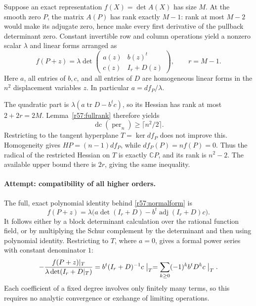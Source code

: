 \documentclass[11pt,a4paper]{article}
\newcommand{\C}{\mathbb{C}}
\numberwithin{equation}{section}
\begin{document}
Suppose an exact representation $f(X)=\det A(X)$ has size $M$. At the smooth zero $P$, the matrix $A(P)$ has rank exactly $M-1$: rank at most $M-2$ would make its adjugate zero, hence make every first derivative of the pullback determinant zero. Constant invertible row and column operations yield a nonzero scalar $\lambda$ and linear forms arranged as
\begin{equation}\label{r57:normalform}
 f(P+z)=\lambda\det\begin{pmatrix}
 a(z)&b(z)^t\\ c(z)&I_r+D(z)
 \end{pmatrix},\qquad r=M-1.
\end{equation}
Here $a$, all entries of $b,c$, and all entries of $D$ are homogeneous linear forms in the $n^2$ displacement variables $z$. In particular $a=df_P/\lambda$.

The quadratic part is $\lambda(a\operatorname{tr}D-b^tc)$, so its Hessian has rank at most $2+2r=2M$. Lemma~\ref{r57:fullrank} therefore yields
\begin{equation}\label{r57:quadraticbound}
 \operatorname{dc}(\operatorname{per}_n)\geq\lceil n^2/2\rceil.
\end{equation}
Restricting to the tangent hyperplane $T=\ker df_P$ does not improve this. Homogeneity gives $HP=(n-1)df_P$, while $df_P(P)=nf(P)=0$. Thus the radical of the restricted Hessian on $T$ is exactly $\C P$, and its rank is $n^2-2$. The available upper bound there is $2r$, giving the same inequality.

\paragraph{Attempt: compatibility of all higher orders.}
The full, exact polynomial identity behind \eqref{r57:normalform} is
\begin{equation}\label{r57:schur}
 f(P+z)=\lambda\bigl(a\det(I_r+D)-b^t\operatorname{adj}(I_r+D)c\bigr).
\end{equation}
It follows either by a block determinant calculation over the rational function field, or by multiplying the Schur complement by the determinant and then using polynomial identity. Restricting to $T$, where $a=0$, gives a formal power series with constant denominator $1$:
\begin{equation}\label{r57:series}
 -\frac{f(P+z)|_T}{\lambda\det(I_r+D|_T)}
   =b^t(I_r+D)^{-1}c\bigm|_T
   =\sum_{k\geq0}(-1)^k b^tD^kc\bigm|_T.
\end{equation}
Each coefficient of a fixed degree involves only finitely many terms, so this requires no analytic convergence or exchange of limiting operations.
\end{document}
